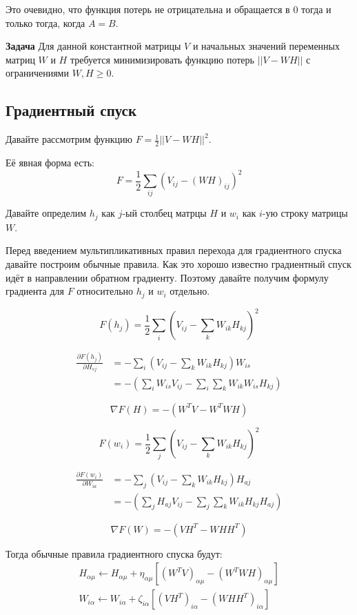 \documentclass[oneside, final, 12pt]{extarticle}
\begin{document}
Это очевидно, что функция потерь не отрицательна
и обращается в 0 тогда и только тогда, когда $A = B$.

\textbf{Задача} Для данной константной матрицы $V$
и начальных значений переменных матриц $W$ и $H$
требуется минимизировать функцию потерь $||V-WH||$
с ограничениями $W,H \geqslant 0$.

\subsection{Градиентный спуск}
Давайте рассмотрим функцию $F = \frac{1}{2}||V - WH||^2$.

Её явная форма есть:
\[
  F = \frac{1}{2} \sum_{ij}
  \left(
    V_{ij} - (WH)_{ij}
  \right)^2
\]

Давайте определим $h_j$ как $j$-ый столбец матрцы $H$
и $w_i$ как $i$-ую строку матрицы $W$.

Перед введением мультипликативных правил перехода
для градиентного спуска давайте построим обычные правила.
Как это хорошо известно градиентный спуск идёт в направлении
обратном градиенту. Поэтому давайте получим формулу градиента
для $F$ относительно $h_j$ и $w_i$ отдельно.

\[
  F(h_j) = \frac{1}{2} \sum_{i}
  \left(
    V_{ij} - \sum_{k}W_{ik}H_{kj}
  \right)^2
\]

\begin{align*}
  \frac{\partial F(h_j)}{\partial H_{sj}}
  &=
  - \sum_i
    \left(
      V_{ij} - \sum_k W_{ik}H_{kj}
    \right)
  W_{is} \\
  &=
  -
    \left(
      \sum_i W_{is}V_{ij} - \sum_i\sum_kW_{ik}W_{is}H_{kj}
    \right)
\end{align*}

\[
  \nabla F(H) = - ( W^TV - W^TWH )
\]

\[
  F(w_i) = \frac{1}{2}\sum_j
    \left( V_{ij} - \sum_k W_{ik}H_{kj} \right)^2
\]

\begin{align*}
  \frac{\partial F(w_i)}{\partial W_{ia}}
  &=
  - \sum_j
    \left(
      V_{ij} - \sum_k W_{ik}H_{kj}
    \right)
  H_{aj} \\
  &=
  -
    \left(
      \sum_j H_{aj}V_{ij} - \sum_j \sum_k W_{ik}H_{kj}H_{aj}
    \right)
\end{align*}

\[
  \nabla F(W) = - ( VH^T - WHH^T )
\]

Тогда обычные правила градиентного спуска будут:
\begin{align*}
  H_{\alpha\mu} \leftarrow H_{\alpha\mu} +
  \eta_{\alpha\mu} \left[
     (W^TV)_{\alpha\mu} - (W^TWH)_{\alpha\mu}
  \right] \\
  W_{i\alpha} \leftarrow W_{i\alpha} +
  \zeta_{i\alpha} \left[
    (VH^T)_{i\alpha} - (WHH^T)_{i\alpha}
  \right]
\end{align*}
\end{document}
